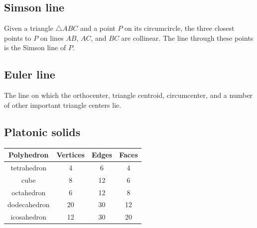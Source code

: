 \subsection{Simson line}
Given a triangle $\triangle ABC$ and a point $P$ on its circumcircle,
the three closest points to $P$ on lines $AB$, $AC$, and $BC$ are collinear.
The line through these points is the Simson line of $P$.

\subsection{Euler line}
The line on which the orthocenter, triangle centroid, circumcenter,
and a number of other important triangle centers lie. 

\subsection{Platonic solids}
\begin{tabular}{ |c|c|c|c| } 
\hline
Polyhedron & Vertices & Edges & Faces \\ 
\hline
tetrahedron & 4 & 6 & 4 \\ 
\hline
cube & 8 & 12 & 6 \\ 
\hline
octahedron & 6 & 12 & 8 \\
\hline
dodecahedron & 20 & 30 & 12 \\
\hline
icosahedron & 12 & 30 & 20 \\
\hline
\end{tabular}
 
